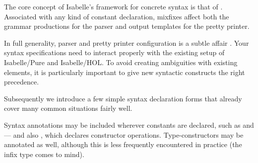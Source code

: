 %
\begin{isabellebody}%
\def\isabellecontext{Documents}%
%
\isadelimtheory
%
\endisadelimtheory
%
\isatagtheory
%
\endisatagtheory
{\isafoldtheory}%
%
\isadelimtheory
%
\endisadelimtheory
%
\isamarkuptrue%
%
\begin{isamarkuptext}%
The core concept of Isabelle's framework for concrete syntax is that
  of .  Associated with any kind of
  constant declaration, mixfixes affect both the grammar productions
  for the parser and output templates for the pretty printer.

  In full generality, parser and pretty printer configuration is a
  subtle affair \cite{isabelle-ref}.  Your syntax specifications need
  to interact properly with the existing setup of Isabelle/Pure and
  Isabelle/HOL\@.  To avoid creating ambiguities with existing
  elements, it is particularly important to give new syntactic
  constructs the right precedence.

  \medskip Subsequently we introduce a few simple syntax declaration
  forms that already cover many common situations fairly well.%
\end{isamarkuptext}%
\isamarkuptrue%
%
\isamarkuptrue%
%
\begin{isamarkuptext}%
Syntax annotations may be included wherever constants are declared,
  such as  and  --- and also
  , which declares constructor operations.
  Type-constructors may be annotated as well, although this is less
  frequently encountered in practice (the infix type \isa{{\isasymtimes}} comes
  to mind).


\end{isamarkuptext}
\end{isabellebody}
